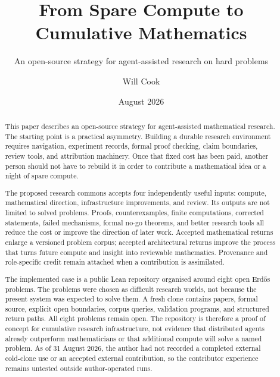 \documentclass[10pt]{article}
\title{From Spare Compute to Cumulative Mathematics}
\subtitle{An open-source strategy for agent-assisted research on hard problems}
\author{Will Cook}
\date{August 2026}
\begin{document}
\maketitle
{}
\fontsize{9.2pt}{11pt}\selectfont

\begin{abstract}
This paper describes an open-source strategy for agent-assisted mathematical
research.  The starting point is a practical asymmetry.  Building a durable
research environment requires navigation, experiment records, formal proof
checking, claim boundaries, review tools, and attribution machinery.  Once
that fixed cost has been paid, another person should not have to rebuild it in
order to contribute a mathematical idea or a night of spare compute.

The proposed research commons accepts four independently useful inputs:
compute, mathematical direction, infrastructure improvements, and review.
Its outputs are not limited to solved problems.  Proofs, counterexamples,
finite computations, corrected statements, failed mechanisms, formal no-go
theorems, and better research tools all reduce the cost or improve the
direction of later work.  Accepted mathematical returns enlarge a versioned
problem corpus; accepted architectural returns improve the process that
turns future compute and insight into reviewable mathematics.  Provenance and
role-specific credit remain attached when a contribution is assimilated.

The implemented case is a public Lean repository organised around eight open
Erd\H{o}s problems.  The problems were chosen as difficult research worlds,
not because the present system was expected to solve them.  A fresh clone
contains papers, formal source, explicit open boundaries, corpus queries,
validation programs, and structured return paths.  All eight problems remain
open.  The repository is therefore a proof of concept for cumulative research
infrastructure, not evidence that distributed agents already outperform
mathematicians or that additional compute will solve a named problem. As of
31 August 2026, the author had not recorded a completed external cold-clone use
or an accepted external contribution, so the contributor experience remains
untested outside author-operated runs.


\end{abstract}
\end{document}

